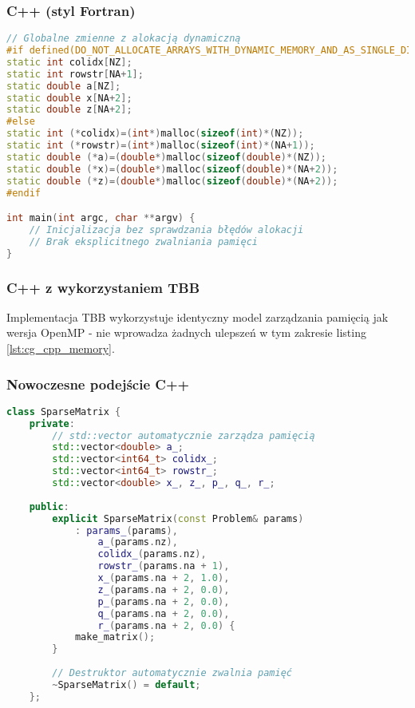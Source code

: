 \subsubsection{C++ (styl Fortran)}
\begin{lstlisting}[language=C++, caption={Zarządzanie pamięcią w C++ (styl Fortran)}, label={lst:cg_cpp_memory}]
    // Globalne zmienne z alokacją dynamiczną
#if defined(DO_NOT_ALLOCATE_ARRAYS_WITH_DYNAMIC_MEMORY_AND_AS_SINGLE_DIMENSION)
static int colidx[NZ];
static int rowstr[NA+1];
static double a[NZ];
static double x[NA+2];
static double z[NA+2];
#else
static int (*colidx)=(int*)malloc(sizeof(int)*(NZ));
static int (*rowstr)=(int*)malloc(sizeof(int)*(NA+1));
static double (*a)=(double*)malloc(sizeof(double)*(NZ));
static double (*x)=(double*)malloc(sizeof(double)*(NA+2));
static double (*z)=(double*)malloc(sizeof(double)*(NA+2));
#endif

int main(int argc, char **argv) {
    // Inicjalizacja bez sprawdzania błędów alokacji
    // Brak eksplicitnego zwalniania pamięci
}
\end{lstlisting}

\subsubsection{C++ z wykorzystaniem TBB}
Implementacja TBB wykorzystuje identyczny model zarządzania pamięcią jak wersja OpenMP - nie wprowadza żadnych ulepszeń w tym zakresie listing \ref{lst:cg_cpp_memory}.

\subsubsection{Nowoczesne podejście C++}
\begin{lstlisting}[language=C++, caption={Zarządzanie pamięcią w nowoczesnym C++}, label={lst:cg_modern_cpp_memory}]
class SparseMatrix {
    private:
        // std::vector automatycznie zarządza pamięcią
        std::vector<double> a_;
        std::vector<int64_t> colidx_;
        std::vector<int64_t> rowstr_;
        std::vector<double> x_, z_, p_, q_, r_;
        
    public:
        explicit SparseMatrix(const Problem& params) 
            : params_(params),
                a_(params.nz),
                colidx_(params.nz),
                rowstr_(params.na + 1),
                x_(params.na + 2, 1.0),
                z_(params.na + 2, 0.0),
                p_(params.na + 2, 0.0),
                q_(params.na + 2, 0.0),
                r_(params.na + 2, 0.0) {
            make_matrix();
        }
        
        // Destruktor automatycznie zwalnia pamięć
        ~SparseMatrix() = default;
    };
\end{lstlisting}

